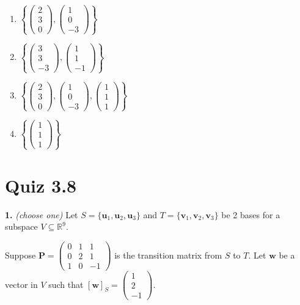 \documentclass[10pt,a4paper]{article}
\begin{document}
\begin{enumerate}[label=(\Alph*)]
\item \(\left\{\begin{pmatrix}2\\3\\0\end{pmatrix},\begin{pmatrix}1\\0\\-3\end{pmatrix}\right\}\)
\item \(\left\{\begin{pmatrix}3\\3\\-3\end{pmatrix},\begin{pmatrix}1\\1\\-1\end{pmatrix}\right\}\)
\item \(\left\{\begin{pmatrix}2\\3\\0\end{pmatrix},\begin{pmatrix}1\\0\\-3\end{pmatrix},\begin{pmatrix}1\\1\\1\end{pmatrix}\right\}\)
\item \(\left\{\begin{pmatrix}1\\1\\1\end{pmatrix}\right\}\)
\end{enumerate}
\smallskip
\section{Quiz 3.8}
\textbf{1.} \textit{(choose one)} Let \(S=\{\mathbf{u}_1,\mathbf{u}_2,\mathbf{u}_3\}\) and \(T=\{\mathbf{v}_1,\mathbf{v}_2,\mathbf{v}_3\}\) be 2 bases for a subspace \(V\subseteq\mathbb{R}^9\).

Suppose \(\mathbf{P}=\begin{pmatrix}      0  &   1  &   1\\      0   &  2 &    1\\      1   &  0 &   -1 \end{pmatrix}\) is the transition matrix from \(S\) to \(T\). Let \(\mathbf{w}\) be a vector in \(V\) such that \([\mathbf{w}]_S=\begin{pmatrix}1\\2\\-1\end{pmatrix}\). 
\end{document}
